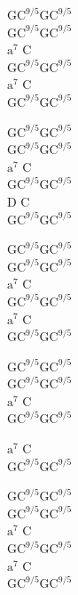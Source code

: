 \begin{chord}
    G$\mathrm{C^{9/5}}$G$\mathrm{C^{9/5}}$\\
    G$\mathrm{C^{9/5}}$G$\mathrm{C^{9/5}}$\\
    $\mathrm{a^7}$ C\\
    G$\mathrm{C^{9/5}}$G$\mathrm{C^{9/5}}$\\
    $\mathrm{a^7}$ C\\
    G$\mathrm{C^{9/5}}$G$\mathrm{C^{9/5}}$

    G$\mathrm{C^{9/5}}$G$\mathrm{C^{9/5}}$\\
    G$\mathrm{C^{9/5}}$G$\mathrm{C^{9/5}}$\\
    $\mathrm{a^7}$ C\\
    G$\mathrm{C^{9/5}}$G$\mathrm{C^{9/5}}$\\
    D C\\
    G$\mathrm{C^{9/5}}$G$\mathrm{C^{9/5}}$

    G$\mathrm{C^{9/5}}$G$\mathrm{C^{9/5}}$\\
    G$\mathrm{C^{9/5}}$G$\mathrm{C^{9/5}}$\\
    $\mathrm{a^7}$ C\\
    G$\mathrm{C^{9/5}}$G$\mathrm{C^{9/5}}$\\
    $\mathrm{a^7}$ C\\
    G$\mathrm{C^{9/5}}$G$\mathrm{C^{9/5}}$

    G$\mathrm{C^{9/5}}$G$\mathrm{C^{9/5}}$\\
    G$\mathrm{C^{9/5}}$G$\mathrm{C^{9/5}}$\\
    $\mathrm{a^7}$ C\\
    G$\mathrm{C^{9/5}}$G$\mathrm{C^{9/5}}$

    $\mathrm{a^7}$ C\\
    G$\mathrm{C^{9/5}}$G$\mathrm{C^{9/5}}$

    G$\mathrm{C^{9/5}}$G$\mathrm{C^{9/5}}$\\
    G$\mathrm{C^{9/5}}$G$\mathrm{C^{9/5}}$\\
    $\mathrm{a^7}$ C\\
    G$\mathrm{C^{9/5}}$G$\mathrm{C^{9/5}}$\\
    $\mathrm{a^7}$ C\\
    G$\mathrm{C^{9/5}}$G$\mathrm{C^{9/5}}$
\end{chord}
